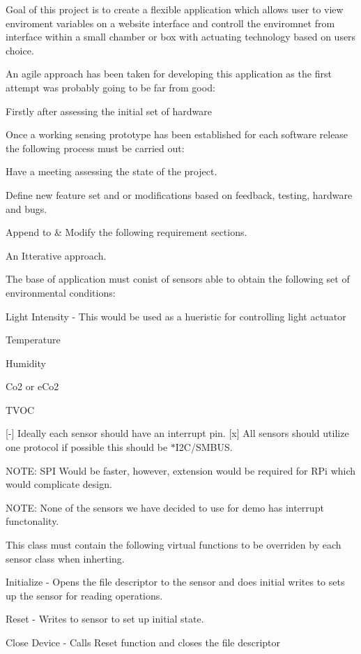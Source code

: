 Goal of this project is to create a flexible application which allows user to view enviroment variables on a website interface and controll the enviromnet from interface within a small chamber or box with actuating technology based on user\textquotesingle{}s choice.

An agile approach has been taken for developing this application as the first attempt was probably going to be far from good\+:

Firstly after assessing the initial set of hardware

Once a working sensing prototype has been established for each software release the following process must be carried out\+:
\begin{DoxyEnumerate}
\item Have a meeting assessing the state of the project.
\item Define new feature set and or modifications based on feedback, testing, hardware and bugs.
\item Append to \& Modify the following requirement sections.
\end{DoxyEnumerate}

An Itterative approach.

The base of application must conist of sensors able to obtain the following set of environmental conditions\+:
\begin{DoxyItemize}
\item Light Intensity -\/ This would be used as a hueristic for controlling light actuator
\item Temperature
\item Humidity
\item Co2 or e\+Co2
\item T\+V\+OC
\end{DoxyItemize}

\mbox{[}-\/\mbox{]} Ideally each sensor should have an interrupt pin. \mbox{[}x\mbox{]} All sensors should utilize one protocol if possible this should be $\ast$\+I2\+C/\+S\+M\+B\+US.

N\+O\+TE\+: S\+PI Would be faster, however, extension would be required for R\+Pi which would complicate design.

N\+O\+TE\+: None of the sensors we have decided to use for demo has interrupt functonality.

This class must contain the following virtual functions to be overriden by each sensor class when inherting.
\begin{DoxyItemize}
\item Initialize -\/ Opens the file descriptor to the sensor and does initial writes to sets up the sensor for reading operations.
\item Reset -\/ Writes to sensor to set up initial state.
\item Close Device -\/ Calls Reset function and closes the file descriptor
\end{DoxyItemize}

